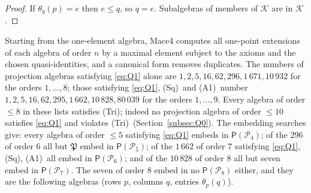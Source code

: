 \documentclass[11pt]{amsart}
\theoremstyle{definition}
\renewcommand{\P}{\mathcal{P}}      %
\newcommand{\PA}{\mathsf{P}}         %
\newcommand{\Tri}{\textup{(Tri)}}
\newcommand{\Wire}{\textup{(Sq)}}      %
\newcommand{\Rcond}{\textup{(A1)}}     %
\begin{document}
\begin{proof}
If $\theta_q(p)=e$ then $e\le q$, so $q=e$. Subalgebras of members of $\mathcal K$ are in $\mathcal K$.
\end{proof}

Starting from the one-element algebra, Mace4 computes all one-point extensions of each algebra of order $n$ by a maximal element subject to the axioms and the chosen quasi-identities, and a canonical form removes duplicates. The numbers of projection algebras satisfying \eqref{eq:Q1} alone are $1,2,5,16,62,296,1\,671,10\,932$ for the orders $1,\dots,8$; those satisfying \eqref{eq:Q1}, \Wire\ and \Rcond\ number $1,2,5,16,62,295,1\,662,10\,828,80\,039$ for the orders $1,\dots,9$. Every algebra of order $\le 8$ in these lists satisfies \Tri; indeed no projection algebra of order $\le10$ satisfies \eqref{eq:Q1} and violates \Tri\ (Section~\ref{subsec:Q0}). The embedding searches give: every algebra of order $\le5$ satisfying \eqref{eq:Q1} embeds in $\PA(\P_4)$; of the $296$ of order $6$ all but $\mathfrak P$ embed in $\PA(\P_5)$; of the $1\,662$ of order $7$ satisfying \eqref{eq:Q1}, \Wire, \Rcond\ all embed in $\PA(\P_6)$; and of the $10\,828$ of order $8$ all but seven embed in $\PA(\P_7)$. The seven of order $8$ embed in no $\PA(\P_8)$ either, and they are the following algebras (rows $p$, columns $q$, entries $\theta_p(q)$).
\end{document}
